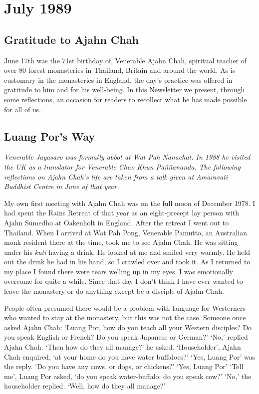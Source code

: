 
\chapter{July 1989}

\section{Gratitude to Ajahn Chah}

June 17th was the 71st birthday of, Venerable Ajahn Chah, spiritual
teacher of over 80 forest monasteries in Thailand, Britain and around
the world. As is customary in the monasteries in England, the day's
practice was offered in gratitude to him and for his well-being. In this
Newsletter we present, through some reflections, an occasion for readers
to recollect what he has made possible for all of us.

\section{Luang Por's Way}

\emph{Venerable Jayasaro was formally abbot at Wat Pah
Nanachat. In 1988 he visited the UK as a translator for Venerable Chao
Khun Paññananda. The following reflections on Ajahn Chah's life are
taken from a talk given at Amaravati Buddhist Centre in June of that
year.}

My own first meeting with Ajahn Chah was on the full moon of December
1978. I had spent the Rains Retreat of that year as an eight-precept lay
person with Ajahn Sumedho at Oakenholt in England. After the retreat I
went out to Thailand. When I arrived at Wat Pah Pong, Venerable Pamutto,
an Australian monk resident there at the time, took me to see Ajahn
Chah. He was sitting under his \emph{kuti} having a drink. He looked at
me and smiled very warmly. He held out the drink he had in his hand, so
I crawled over and took it. As I returned to my place I found there were
tears welling up in my eyes. I was emotionally overcome for quite a
while. Since that day I don't think I have ever wanted to leave the
monastery or do anything except be a disciple of Ajahn Chah.

People often presumed there would be a problem with language for
Westerners who wanted to stay at the monastery, but this was not the
case. Someone once asked Ajahn Chah: `Luang Por, how do you teach all
your Western disciples? Do you speak English or French? Do you speak
Japanese or German?' `No,' replied Ajahn Chah. `Then how do they all
manage?' he asked. `Householder', Ajahn Chah enquired, `at your home do
you have water buffaloes?' `Yes, Luang Por' was the reply. `Do you have
any cows, or dogs, or chickens?' `Yes, Luang Por' `Tell me', Luang Por
asked, `do you speak water-buffalo: do you speak cow?' `No,' the
householder replied. `Well, how do they all manage?'

